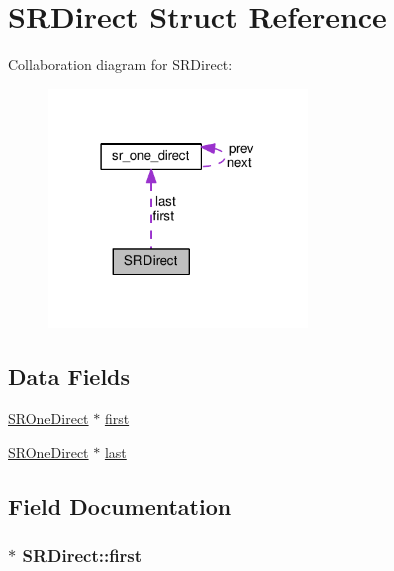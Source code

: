 \hypertarget{structSRDirect}{}\section{S\+R\+Direct Struct Reference}
\label{structSRDirect}


Collaboration diagram for S\+R\+Direct\+:\nopagebreak
\begin{figure}[H]
\begin{center}
\leavevmode
\includegraphics[width=195pt]{structSRDirect__coll__graph}
\end{center}
\end{figure}
\subsection*{Data Fields}
\begin{DoxyCompactItemize}
\item 
\hyperlink{src__rdr__c_8c_a901df9436a40f2eb43741da55a6dfd69}{S\+R\+One\+Direct} $\ast$ \hyperlink{structSRDirect_a418d898d49d9bfd256935f4e28bbf11b}{first}
\item 
\hyperlink{src__rdr__c_8c_a901df9436a40f2eb43741da55a6dfd69}{S\+R\+One\+Direct} $\ast$ \hyperlink{structSRDirect_aadd740950d79ebfff5baee79c33ced18}{last}
\end{DoxyCompactItemize}


\subsection{Field Documentation}
\subsubsection[{\texorpdfstring{first}{first}}]{$\ast$ S\+R\+Direct\+::first}\hypertarget{structSRDirect_a418d898d49d9bfd256935f4e28bbf11b}{}\label{structSRDirect_a418d898d49d9bfd256935f4e28bbf11b}
